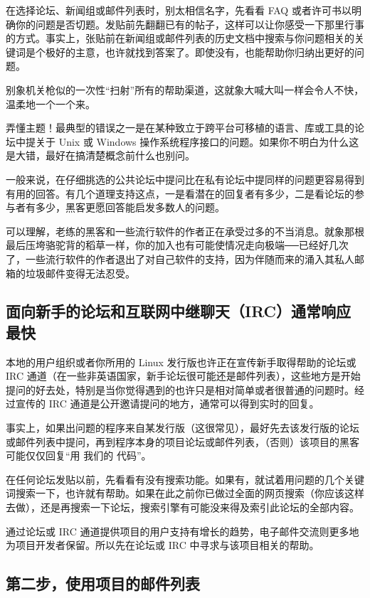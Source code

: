 在选择论坛、新闻组或邮件列表时，别太相信名字，先看看 FAQ 或者许可书以明确你的问题是否切题。发贴前先翻翻已有的帖子，这样可以让你感受一下那里行事的方式。事实上，张贴前在新闻组或邮件列表的历史文档中搜索与你问题相关的关键词是个极好的主意，也许就找到答案了。即使没有，也能帮助你归纳出更好的问题。

别象机关枪似的一次性“扫射”所有的帮助渠道，这就象大喊大叫一样会令人不快，温柔地一个一个来。

弄懂主题！最典型的错误之一是在某种致立于跨平台可移植的语言、库或工具的论坛中提关于 Unix 或 Windows 操作系统程序接口的问题。如果你不明白为什么这是大错，最好在搞清楚概念前什么也别问。

一般来说，在仔细挑选的公共论坛中提问比在私有论坛中提同样的问题更容易得到有用的回答。有几个道理支持这点，一是看潜在的回复者有多少，二是看论坛的参与者有多少，黑客更愿回答能启发多数人的问题。

可以理解，老练的黑客和一些流行软件的作者正在承受过多的不当消息。就象那根最后压垮骆驼背的稻草一样，你的加入也有可能使情况走向极端──已经好几次了，一些流行软件的作者退出了对自己软件的支持，因为伴随而来的涌入其私人邮箱的垃圾邮件变得无法忍受。


\subsection{面向新手的论坛和互联网中继聊天（IRC）通常响应最快}

本地的用户组织或者你所用的 Linux 发行版也许正在宣传新手取得帮助的论坛或 IRC 通道（在一些非英语国家，新手论坛很可能还是邮件列表），这些地方是开始提问的好去处，特别是当你觉得遇到的也许只是相对简单或者很普通的问题时。经过宣传的 IRC 通道是公开邀请提问的地方，通常可以得到实时的回复。

事实上，如果出问题的程序来自某发行版（这很常见），最好先去该发行版的论坛或邮件列表中提问，再到程序本身的项目论坛或邮件列表，（否则）该项目的黑客可能仅仅回复“用 我们的 代码”。

在任何论坛发贴以前，先看看有没有搜索功能。如果有，就试着用问题的几个关键词搜索一下，也许就有帮助。如果在此之前你已做过全面的网页搜索（你应该这样去做），还是再搜索一下论坛，搜索引擎有可能没来得及索引此论坛的全部内容。

通过论坛或 IRC 通道提供项目的用户支持有增长的趋势，电子邮件交流则更多地为项目开发者保留。所以先在论坛或 IRC 中寻求与该项目相关的帮助。



\subsection{第二步，使用项目的邮件列表}

